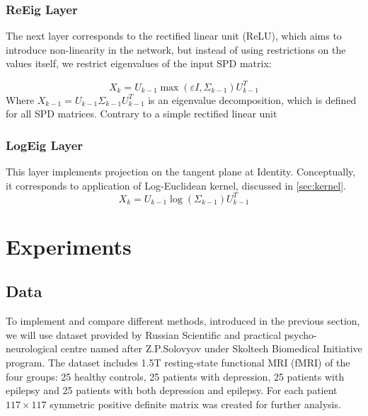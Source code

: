 \documentclass[12pt]{extarticle}
\theoremstyle{definition}
\theoremstyle{remark}
\begin{document}
	\subsubsection*{ReEig Layer}
	The next layer corresponds to the rectified linear unit (ReLU), which aims to introduce non-linearity in the network, but instead of using restrictions on the values itself, we restrict eigenvalues of the input SPD matrix:
	
	\begin{equation*}
	X_k = U_{k-1} \max (\varepsilon I, \Sigma_{k-1})U_{k-1}^T
	\end{equation*}
	Where $X_{k-1} = U_{k-1}\Sigma_{k-1} U_{k-1}^T$ is an eigenvalue decomposition, which is defined for all SPD matrices. Contrary to a simple rectified linear unit 
	
	\subsubsection*{LogEig Layer}
	
	This layer implements projection on the tangent plane at Identity. Conceptually, it corresponds to application of Log-Euclidean kernel, discussed in \cref{sec:kernel}.
	\begin{equation*}
	X_k = U_{k-1} \log ( \Sigma_{k-1})U_{k-1}^T
	\end{equation*}
	
	
	\newpage
	\section{Experiments}
	\subsection{Data}
	
	To implement and compare different methods, introduced in the previous section, we will use dataset provided by Russian Scientific and practical psycho-neurological centre named after Z.P.Solovyov under Skoltech Biomedical Initiative program. The dataset includes 1.5T resting-state functional MRI (fMRI) of the four groups: 25 healthy controls, 25 patients with depression, 25 patients with epilepsy and 25 patients with both depression and epilepsy. For each patient $117\times 117$ symmetric positive definite matrix was created for further analysis. 
	
\end{document}
